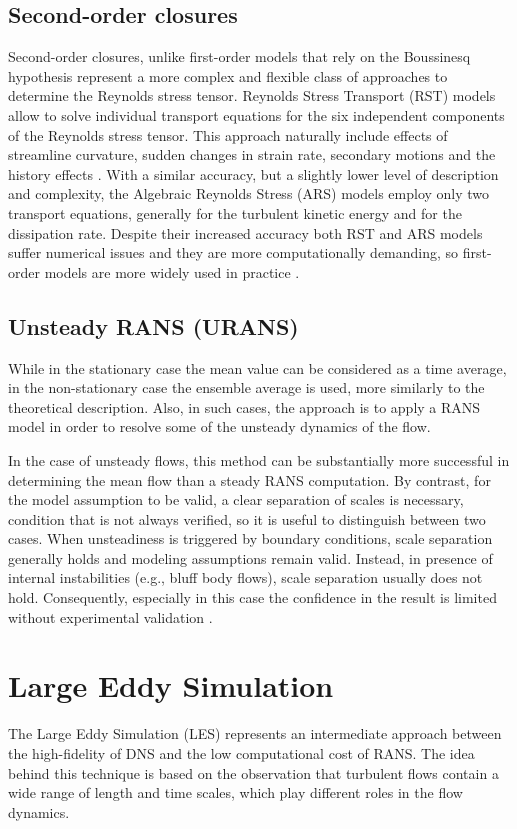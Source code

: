 \documentclass[12pt, a4paper, twoside, openright]{book}
\begin{document}
\subsection{Second-order closures}
Second-order closures, unlike first-order models that rely on the Boussinesq hypothesis represent a more complex and flexible class of approaches to determine the Reynolds stress tensor. Reynolds Stress Transport (RST) models allow to solve individual transport equations for the six independent components of the Reynolds stress tensor. This approach naturally include effects of streamline curvature, sudden changes in strain rate, secondary motions and the history effects \cite{tubulence-wilcox}. With a similar accuracy, but a slightly lower level of description and complexity, the Algebraic Reynolds Stress (ARS) models employ only two transport equations, generally for the turbulent kinetic energy and for the dissipation rate. Despite their increased accuracy both RST and ARS models suffer numerical issues and they are more computationally demanding, so first-order models are more widely used in practice \cite{cfd-blazek}.

\subsection{Unsteady RANS (URANS)}
While in the stationary case the mean value can be considered as a time average, in the non-stationary case the ensemble average is used, more similarly to the theoretical description. Also, in such cases, the approach is to apply a RANS model in order to resolve some of the unsteady dynamics of the flow.

In the case of unsteady flows, this method can be substantially more successful in determining the mean flow than a steady RANS computation. By contrast, for the model assumption to be valid, a clear separation of scales is necessary, condition that is not always verified, so it is useful to distinguish between two cases. When unsteadiness is triggered by boundary conditions, scale separation generally holds and modeling assumptions remain valid. Instead, in presence of internal instabilities (e.g., bluff body flows), scale separation usually does not hold. Consequently, especially in this case the confidence in the result is limited without experimental validation \cite{urans-hybrid}.

\section{Large Eddy Simulation}
The Large Eddy Simulation (LES) represents an intermediate approach between the high-fidelity of DNS and the low computational cost of RANS. The idea behind this technique is based on the observation that turbulent flows contain a wide range of length and time scales, which play different roles in the flow dynamics.
\end{document}
